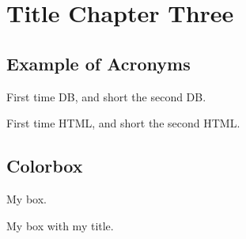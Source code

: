 \chapter{Title Chapter Three}

\section{Example of Acronyms}

First time \gls{DB}, and short the second \gls{DB}.
\par
First time \gls{HTML}, and short the second \gls{HTML}.

\section{Colorbox}

\begin{tcolorbox}[colback=red!5!white,colframe=red!75!black]
  My box.
\end{tcolorbox}

\begin{tcolorbox}[colback=blue!5!white,colframe=blue!75!black,title=My title]
  My box with my title.
\end{tcolorbox}